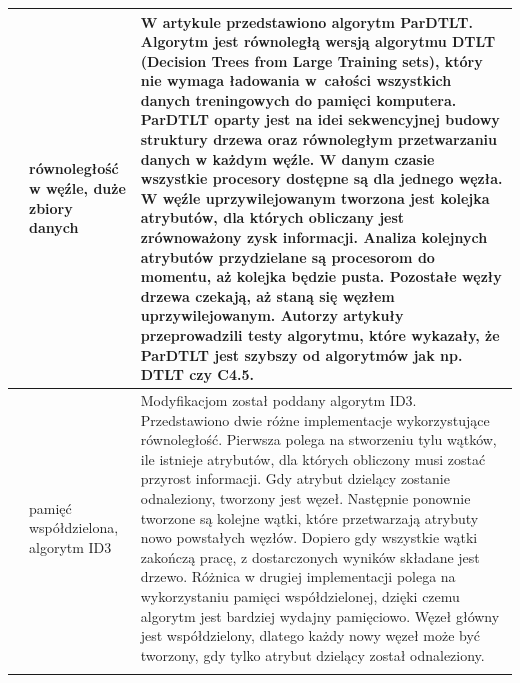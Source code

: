 \documentclass[12pt]{article}
\begin{document}
\begin{center}
\begin{longtable}{| c | p{} | p{} |}
            \hline

            \cite{parallel-algorithm-to-induce-decision-trees} &

            równoległość w węźle, duże zbiory danych &

            W artykule przedstawiono algorytm ParDTLT. Algorytm jest równoległą wersją algorytmu
            DTLT (Decision Trees from Large Training sets), który nie wymaga ładowania w~całości wszystkich danych
            treningowych do pamięci komputera. ParDTLT oparty jest na idei sekwencyjnej budowy struktury
            drzewa oraz równoległym przetwarzaniu danych w każdym węźle. W danym czasie wszystkie procesory
            dostępne są dla jednego węzła. W węźle uprzywilejowanym tworzona jest kolejka atrybutów, dla
            których obliczany jest zrównoważony zysk informacji. Analiza kolejnych
            atrybutów przydzielane są procesorom do momentu, aż kolejka będzie pusta. Pozostałe węzły drzewa czekają, aż
            staną się węzłem uprzywilejowanym. Autorzy artykuły przeprowadzili testy algorytmu, które wykazały, że
            ParDTLT jest szybszy od algorytmów jak np. DTLT czy C4.5. \\

            \hline

            \cite{improved-id3-decision-tree} &

            pamięć \newline współdzielona, algorytm ID3 &

            Modyfikacjom został poddany algorytm ID3. Przedstawiono dwie różne implementacje wykorzystujące równoległość.
            Pierwsza polega na stworzeniu tylu wątków, ile istnieje atrybutów, dla których obliczony musi zostać
            przyrost informacji. Gdy atrybut dzielący zostanie odnaleziony, tworzony jest węzeł. Następnie ponownie
            tworzone są kolejne wątki, które przetwarzają atrybuty nowo powstałych węzłów. Dopiero gdy wszystkie wątki
            zakończą pracę, z dostarczonych wyników składane jest drzewo. Różnica w drugiej implementacji polega na 
            wykorzystaniu pamięci współdzielonej, dzięki czemu algorytm jest bardziej wydajny pamięciowo. 
            Węzeł główny jest współdzielony, dlatego każdy nowy węzeł może być tworzony, gdy tylko atrybut dzielący
            został odnaleziony. \\
            
            \hline
            
            \cite{research-parallel-map-reduce} &


\end{longtable}
\end{center}
\end{document}
